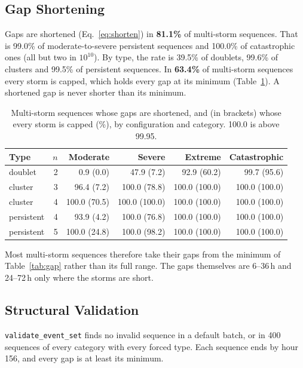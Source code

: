 \documentclass[11pt,a4paper]{article}
\begin{document}
\subsection{Gap Shortening}
Gaps are shortened (Eq.~\eqref{eq:shorten}) in \textbf{81.1\%} of multi-storm sequences.
That is 99.0\% of moderate-to-severe persistent sequences and 100.0\% of catastrophic ones
(all but two in $10^{10}$). By type, the rate is 39.5\% of doublets, 99.6\% of clusters
and 99.5\% of persistent sequences. In \textbf{63.4\%} of multi-storm sequences every storm
is capped, which holds every gap at its minimum (Table~\ref{tab:gaps}). A shortened gap is
never shorter than its minimum.
\begin{table}[H]
\centering\small
\caption{Multi-storm sequences whose gaps are shortened, and (in brackets) whose every
storm is capped (\%), by configuration and category. 100.0 is above 99.95.}\label{tab:gaps}
\begin{tabular}{lrrrrr}
\toprule
Type & $n$ & Moderate & Severe & Extreme & Catastrophic \\
\midrule
doublet & 2 & 0.9 (0.0) & 47.9 (7.2) & 92.9 (60.2) & 99.7 (95.6) \\
cluster & 3 & 96.4 (7.2) & 100.0 (78.8) & 100.0 (100.0) & 100.0 (100.0) \\
cluster & 4 & 100.0 (70.5) & 100.0 (100.0) & 100.0 (100.0) & 100.0 (100.0) \\
persistent & 4 & 93.9 (4.2) & 100.0 (76.8) & 100.0 (100.0) & 100.0 (100.0) \\
persistent & 5 & 100.0 (24.8) & 100.0 (98.2) & 100.0 (100.0) & 100.0 (100.0) \\
\bottomrule
\end{tabular}
\end{table}
Most multi-storm sequences therefore take their gaps from the minimum of Table~\ref{tab:gap}
rather than its full range. The gaps themselves are 6--36\,h and 24--72\,h only where the
storms are short.

\mkmvalidation

\subsection{Structural Validation}
\texttt{validate\_event\_set} finds no invalid sequence in a default batch, or in 400
sequences of every category with every forced type. Each sequence ends by hour 156, and
every gap is at least its minimum.
\end{document}
